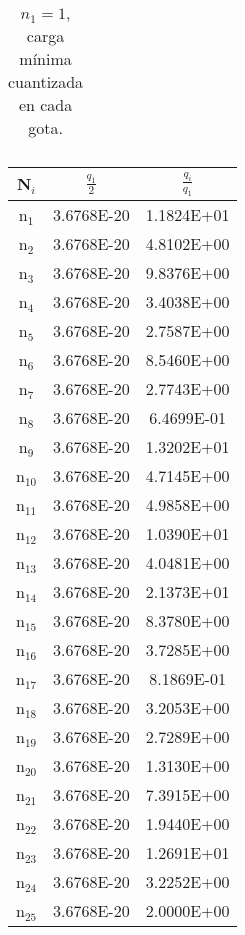 \documentclass{article}
\begin{document}
\begin{enumerate}
\begin{table}[h!]
\begin{tabular}{|c|c|c|}
    \end{tabular}
    \caption{$n_{1}=1$, carga mínima cuantizada en cada gota.}
    \label{tab:my_label}
\end{table}


\begin{table}[h!]
    \centering
    \begin{tabular}{|c|c|c|}
    \hline
       N$_{i}$  & $\frac{q_{1}}{2}$ & $\frac{q_{i}}{q_{1}}$\\
       \hline
       n$_{1}$  & 3.6768E-20 & 1.1824E+01\\
       \hline
       n$_{2}$  & 3.6768E-20 & 4.8102E+00\\
       \hline       
       n$_{3}$  & 3.6768E-20 & 9.8376E+00\\
       \hline       
       n$_{4}$  & 3.6768E-20 & 3.4038E+00\\
       \hline       
       n$_{5}$  & 3.6768E-20 & 2.7587E+00\\
       \hline       
       n$_{6}$  & 3.6768E-20 & 8.5460E+00\\
       \hline       
       n$_{7}$  & 3.6768E-20 & 2.7743E+00\\
       \hline       
       n$_{8}$  & 3.6768E-20 & 6.4699E-01\\
       \hline       
       n$_{9}$  & 3.6768E-20 & 1.3202E+01\\
       \hline       
       n$_{10}$  & 3.6768E-20 & 4.7145E+00\\
       \hline       
       n$_{11}$  & 3.6768E-20 & 4.9858E+00\\
       \hline       
       n$_{12}$  & 3.6768E-20 & 1.0390E+01\\
       \hline       
       n$_{13}$  & 3.6768E-20 & 4.0481E+00\\
       \hline       
       n$_{14}$  & 3.6768E-20 & 2.1373E+01\\
       \hline
       n$_{15}$  & 3.6768E-20 & 8.3780E+00\\
       \hline       
       n$_{16}$  & 3.6768E-20 & 3.7285E+00\\
       \hline       
       n$_{17}$  & 3.6768E-20 & 8.1869E-01\\
       \hline       
       n$_{18}$  & 3.6768E-20 & 3.2053E+00\\
       \hline       
       n$_{19}$  & 3.6768E-20 & 2.7289E+00\\
       \hline       
       n$_{20}$  & 3.6768E-20 & 1.3130E+00\\
       \hline       
       n$_{21}$  & 3.6768E-20 & 7.3915E+00\\
       \hline       
       n$_{22}$  & 3.6768E-20 & 1.9440E+00\\
       \hline       
       n$_{23}$  & 3.6768E-20 & 1.2691E+01\\
       \hline       
       n$_{24}$  & 3.6768E-20 & 3.2252E+00\\
       \hline       
       n$_{25}$  & 3.6768E-20 & 2.0000E+00\\
       \hline


\end{tabular}
\end{table}
\end{enumerate}
\end{document}
